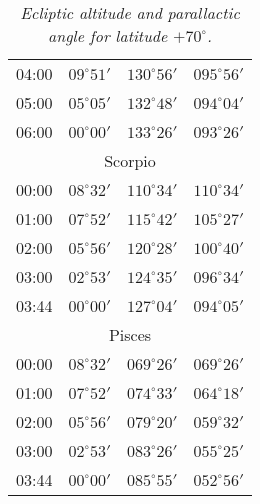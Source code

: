 \begin{table}
\begin{Parallel}{}{}
{{\begin{tabular}{l|lll}
04:00 & $09^\circ 51'$ & $130^\circ 56'$& $095^\circ 56'$ \\
05:00 & $05^\circ 05'$ & $132^\circ 48'$& $094^\circ 04'$ \\
06:00 & $00^\circ 00'$ & $133^\circ 26'$& $093^\circ 26'$ \\
\multicolumn{4}{c}{Scorpio}\\
00:00 & $08^\circ 32'$ & $110^\circ 34'$& $110^\circ 34'$ \\
01:00 & $07^\circ 52'$ & $115^\circ 42'$& $105^\circ 27'$ \\
02:00 & $05^\circ 56'$ & $120^\circ 28'$& $100^\circ 40'$ \\
03:00 & $02^\circ 53'$ & $124^\circ 35'$& $096^\circ 34'$ \\
03:44 & $00^\circ 00'$ & $127^\circ 04'$& $094^\circ 05'$ \\
\multicolumn{4}{c}{Pisces}\\
00:00 & $08^\circ 32'$ & $069^\circ 26'$& $069^\circ 26'$ \\
01:00 & $07^\circ 52'$ & $074^\circ 33'$& $064^\circ 18'$ \\
02:00 & $05^\circ 56'$ & $079^\circ 20'$& $059^\circ 32'$ \\
03:00 & $02^\circ 53'$ & $083^\circ 26'$& $055^\circ 25'$ \\
03:44 & $00^\circ 00'$ & $085^\circ 55'$& $052^\circ 56'$ \\
\end{tabular}
}}
\end{Parallel}
\caption{\em Ecliptic altitude and parallactic angle for latitude $+70^\circ$.}
\end{table}

